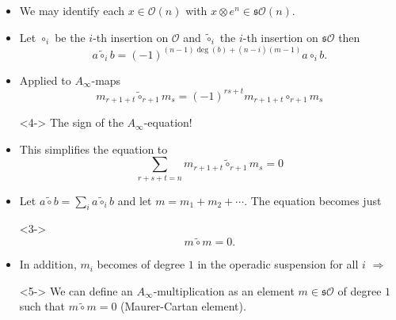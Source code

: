 \documentclass{beamer}
\theoremstyle{definition}
\begin{document}
\begin{frame}
\begin{itemize}

\item<1-> We may identify each $x\in\mathcal{O}(n)$ with $x\otimes e^n\in \mathfrak{s}\mathcal{O}(n)$.
\item<2-> Let $\circ_i$ be the $i$-th insertion on $\mathcal{O}$ and $\tilde{\circ}_i$ the $i$-th insertion on $\mathfrak{s}\mathcal{O}$ then
\[a\tilde{\circ}_ib=(-1)^{(n-1)\deg(b)+(n-i)(m-1)}a\circ_i b.\]
\item<3-> Applied to  $A_\infty$-maps 
\[m_{r+1+t}\tilde{\circ}_{r+1}m_s=(-1)^{rs+t}m_{r+1+t}\circ_{r+1}m_s\]
\item[]<4-> The sign of the $A_\infty$-equation!
\end{itemize}
\end{frame}



\begin{frame}
\begin{itemize}
\item<1-> This simplifies the equation to
\[\sum_{r+s+t=n}m_{r+1+t}\tilde{\circ}_{r+1}m_s=0\] %
\item<2-> Let $a\tilde{\circ}b=\sum_{i}a\tilde{\circ}_ib$ and let $m=m_1+m_2+\cdots$. The equation becomes just
\item[]<3-> \[m\tilde{\circ}m=0.\]
\item<4-> In addition, $m_i$ becomes of degree $1$ in the operadic suspension for all $i$ $\Rightarrow$
\item[]<5-> We can define an $A_\infty$-multiplication as an element $m\in\mathfrak{s}\mathcal{O}$ of degree $1$ such that $m\tilde{\circ}m=0$ (Maurer-Cartan element). 
\end{itemize}
\end{frame}
\end{document}
